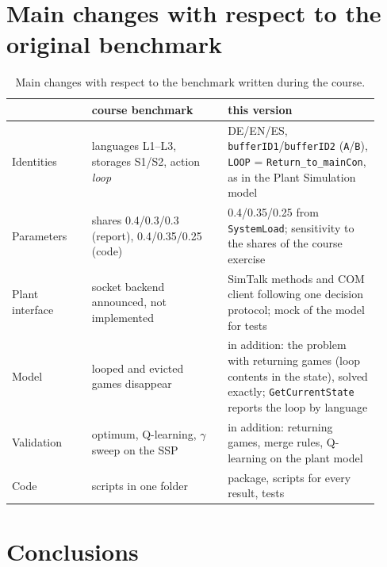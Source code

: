 \documentclass[11pt,a4paper]{article}
\begin{document}
\section{Main changes with respect to the original benchmark}

\begin{table}[H]
  \centering\small
  \caption{Main changes with respect to the benchmark written during the course.}
  \label{tab:changes}
  \begin{tabular}{p{0.2\linewidth}p{0.34\linewidth}p{0.38\linewidth}}
    \toprule
    & course benchmark & this version \\
    \midrule
    Identities & languages L1--L3, storages S1/S2, action \emph{loop} & DE/EN/ES, \texttt{bufferID1}/\texttt{bufferID2}
      (\texttt{A}/\texttt{B}), \texttt{LOOP} = \texttt{Return\_to\_mainCon}, as in the Plant Simulation model \\
    Parameters & shares 0.4/0.3/0.3 (report), 0.4/0.35/0.25 (code) & 0.4/0.35/0.25 from \texttt{SystemLoad};
      sensitivity to the shares of the course exercise \\
    Plant interface & socket backend announced, not implemented & SimTalk methods and COM client following one
      decision protocol; mock of the model for tests \\
    Model & looped and evicted games disappear & in addition: the problem with returning games (loop contents in
      the state), solved exactly; \texttt{GetCurrentState} reports the loop by language \\
    Validation & optimum, Q-learning, $\gamma$ sweep on the SSP & in addition: returning games, merge rules,
      Q-learning on the plant model \\
    Code & scripts in one folder & package, scripts for every result, tests \\
    \bottomrule
  \end{tabular}
\end{table}

\section{Conclusions}
\end{document}
